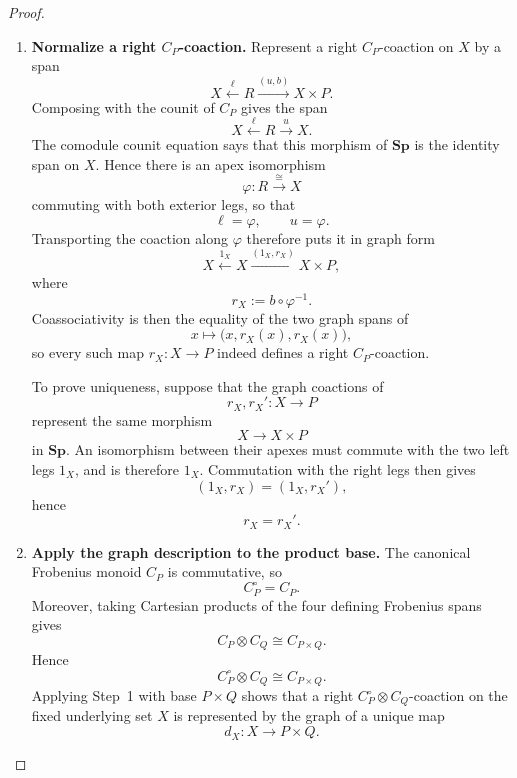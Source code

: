 \documentclass[oneside]{article}
\newcommand{\Sp}{\mathbf{Sp}}
\theoremstyle{plain}
\theoremstyle{definition}
\theoremstyle{remark}
\begin{document}
\begin{proof}
    \leavevmode
    \begin{enumerate}[beginpenalty=10000]
        \item \textbf{Normalize a right \(C_P\)-coaction.} Represent a right \(C_P\)-coaction on \(X\) by a span
        \[
            X
            \xleftarrow{\ell}
            R
            \xrightarrow{(u,b)}
            X\times P.
        \]
        Composing with the counit of \(C_P\) gives the span
        \[
            X
            \xleftarrow{\ell}
            R
            \xrightarrow{u}
            X.
        \]
        The comodule counit equation says that this morphism of \(\Sp\) is the identity span on \(X\). Hence there is an apex isomorphism
        \[
            \varphi:R\xrightarrow{\cong}X
        \]
        commuting with both exterior legs, so that
        \[
            \ell=\varphi,
            \qquad
            u=\varphi.
        \]
        Transporting the coaction along \(\varphi\) therefore puts it in graph form
        \[
            X
            \xleftarrow{1_X}
            X
            \xrightarrow{(1_X,r_X)}
            X\times P,
        \]
        where
        \[
            r_X:=b\circ\varphi^{-1}.
        \]
        Coassociativity is then the equality of the two graph spans of
        \[
            x\longmapsto
            \bigl(x,r_X(x),r_X(x)\bigr),
        \]
        so every such map \(r_X:X\to P\) indeed defines a right \(C_P\)-coaction.

        To prove uniqueness, suppose that the graph coactions of
        \[
            r_X,r_X':X\longrightarrow P
        \]
        represent the same morphism
        \[
            X\longrightarrow X\times P
        \]
        in \(\Sp\). An isomorphism between their apexes must commute with the two left legs \(1_X\), and is therefore \(1_X\). Commutation with the right legs then gives
        \[
            (1_X,r_X)=(1_X,r_X'),
        \]
        hence
        \[
            r_X=r_X'.
        \]

        \item \textbf{Apply the graph description to the product base.} The canonical Frobenius monoid \(C_P\) is commutative, so
        \[
            C_P^\circ=C_P.
        \]
        Moreover, taking Cartesian products of the four defining Frobenius spans gives
        \[
            C_P\otimes C_Q
            \cong
            C_{P\times Q}.
        \]
        Hence
        \[
            C_P^\circ\otimes C_Q
            \cong
            C_{P\times Q}.
        \]
        Applying Step~1 with base \(P\times Q\) shows that a right \(C_P^\circ\otimes C_Q\)-coaction on the fixed underlying set \(X\) is represented by the graph of a unique map
        \[
            d_X:X\longrightarrow P\times Q.
        \]


\end{enumerate}
\end{proof}
\end{document}
